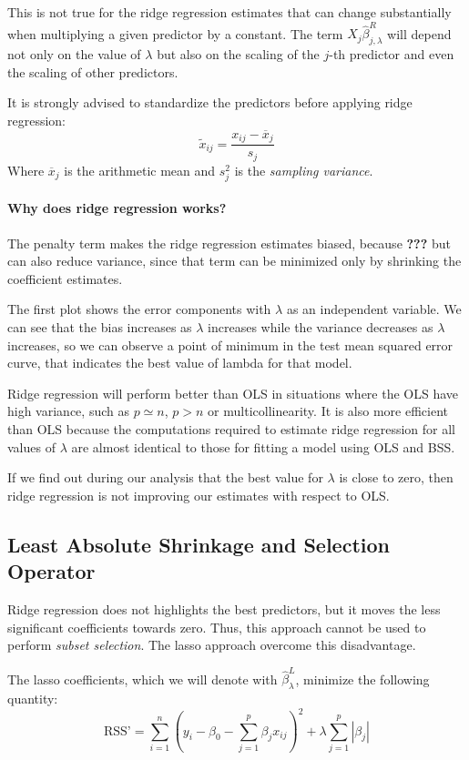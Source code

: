 This is not true for the ridge regression estimates that can change substantially when multiplying a given predictor by a constant. The term $X_j \hat{\beta}_{j,\lambda}^R$ will depend not only on the value of $\lambda$ but also on the scaling of the $j$-th predictor and even the scaling of other predictors.

It is strongly advised to standardize the predictors before applying ridge regression:
\[
    \tilde{x}_{ij} = \frac{x_{ij} - \overline{x}_j}{s_j}
\]
Where $\overline{x}_j$ is the arithmetic mean and $s_j^2$ is the \textit{sampling variance}.

\paragraph*{Why does ridge regression works?}
The penalty term makes the ridge regression estimates biased, because \textbf{???} but can also reduce variance, since that term can be minimized only by
shrinking the coefficient estimates.

The first plot shows the error components with $\lambda$ as an independent variable. We can see that the bias increases as $\lambda$ increases while the variance decreases as $\lambda$ increases, so we can observe a point of minimum in the test mean squared error curve, that indicates the best value of lambda for that model.

Ridge regression will perform better than OLS in situations where the OLS have high variance, such as $p \simeq n$, $p > n$ or multicollinearity. It is also more efficient than OLS because the computations required to estimate ridge regression for all values of $\lambda$ are almost identical to those for fitting a model using OLS and BSS.

If we find out during our analysis that the best value for $\lambda$ is close to zero, then ridge regression is not improving our estimates with respect to OLS.

\subsection*{Least Absolute Shrinkage and Selection Operator}
Ridge regression does not highlights the best predictors, but it moves the less significant coefficients towards zero. Thus, this approach cannot be used to perform \textit{subset selection}. The lasso approach overcome this disadvantage.

The lasso coefficients, which we will denote with $\hat{\beta}_\lambda^L$, minimize the following quantity:
\[
    \text{RSS'} = \sum_{i=1}^{n} \left(y_i - \beta_0 - \sum_{j=1}^{p} \beta_j x_{ij}\right)^2 + \lambda \sum_{j=1}^{p} |\beta_j |
\]

